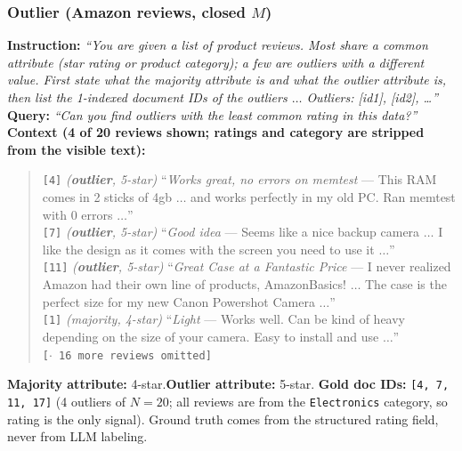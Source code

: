 %
\subsubsection{Outlier (Amazon reviews, closed $M$)}

\textbf{Instruction:} \emph{``You are given a list of product reviews. Most share a common attribute
(star rating or product category); a few are outliers with a different value. First state what the
majority attribute is and what the outlier attribute is, then list the 1-indexed document IDs of the
outliers $\dots$ Outliers: [id1], [id2], \dots''}\\
\textbf{Query:} \emph{``Can you find outliers with the least common rating in this data?''}\\
\textbf{Context (4 of 20 reviews shown; ratings and category are stripped from the visible text):}
\begin{quote}\small
\texttt{[4]} \emph{(\textbf{outlier}, 5-star)} ``\emph{Works great, no errors on memtest} --- This RAM
comes in 2 sticks of 4gb $\dots$ and works perfectly in my old PC. Ran memtest with 0 errors
$\dots$''\\
\texttt{[7]} \emph{(\textbf{outlier}, 5-star)} ``\emph{Good idea} --- Seems like a nice backup camera
$\dots$ I like the design as it comes with the screen you need to use it $\dots$''\\
\texttt{[11]} \emph{(\textbf{outlier}, 5-star)} ``\emph{Great Case at a Fantastic Price} --- I never
realized Amazon had their own line of products, AmazonBasics! $\dots$ The case is the perfect size for
my new Canon Powershot Camera $\dots$''\\
\texttt{[1]} \emph{(majority, 4-star)} ``\emph{Light} --- Works well. Can be kind of heavy depending on
the size of your camera. Easy to install and use $\dots$''\\
\texttt{[$\cdot$ 16 more reviews omitted]}
\end{quote}
\textbf{Majority attribute:} 4-star.\quad\textbf{Outlier attribute:} 5-star.\quad
\textbf{Gold doc IDs:} \texttt{[4, 7, 11, 17]} (4 outliers of $N{=}20$; all reviews are from the
\texttt{Electronics} category, so rating is the only signal). Ground truth comes from the structured
rating field, never from LLM labeling.

